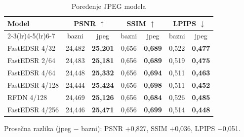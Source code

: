 \begin{table}[H]
    \begin{tabular}{lcccccc}
        \toprule
        Model & \multicolumn{2}{c}{PSNR $\uparrow$} & \multicolumn{2}{c}{SSIM $\uparrow$} & \multicolumn{2}{c}{LPIPS $\downarrow$} \\
        \cmidrule(lr){2-3}\cmidrule(lr){4-5}\cmidrule(lr){6-7}
         & bazni & jpeg & bazni & jpeg & bazni & jpeg \\
        \midrule
        FastEDSR 4/32 & 24,482 & \textbf{25,201} & 0,656 & \textbf{0,689} & 0,522 & \textbf{0,477} \\
        FastEDSR 2/64 & 24,483 & \textbf{25,181} & 0,656 & \textbf{0,689} & 0,519 & \textbf{0,475} \\
        FastEDSR 4/64 & 24,448 & \textbf{25,332} & 0,656 & \textbf{0,694} & 0,511 & \textbf{0,463} \\
        FastEDSR 4/128 & 24,444 & \textbf{25,424} & 0,656 & \textbf{0,698} & 0,511 & \textbf{0,452} \\
        RFDN 4/128 & 24,469 & \textbf{25,126} & 0,656 & \textbf{0,684} & 0,526 & \textbf{0,485} \\
        FastEDSR 4/256 & 24,446 & \textbf{25,471} & 0,656 & \textbf{0,699} & 0,514 & \textbf{0,448} \\
        \bottomrule
    \end{tabular}
    \caption{Poređenje JPEG modela}
    \label{tab:jpeg_4x_DIV2K_jpeg45}
\end{table}

\noindent Prosečna razlika (jpeg $-$ bazni): PSNR $+$0,827, SSIM $+$0,036, LPIPS $-$0,051.